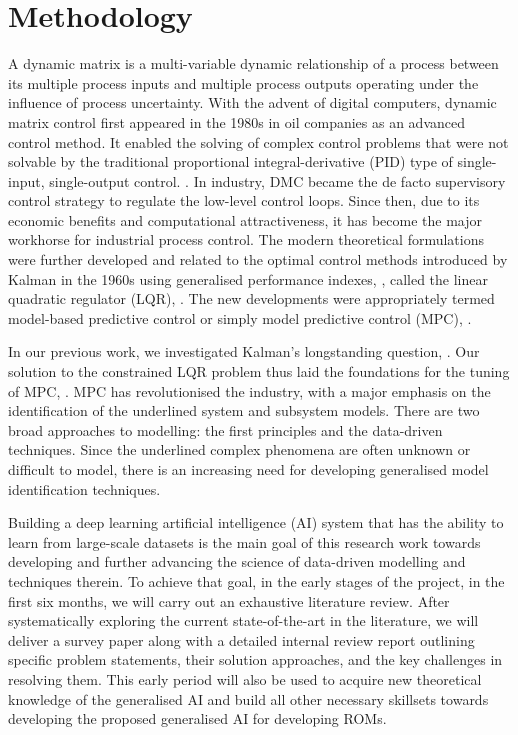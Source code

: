 \documentclass[oneside,11pt,a4paper]{article}
\begin{document}
\section{Methodology}
A dynamic matrix is a multi-variable dynamic relationship of a process between its multiple process inputs and multiple process outputs operating under the influence of process uncertainty. With the advent of digital computers, dynamic matrix control first appeared in the 1980s in oil companies as an advanced control method. It enabled the solving of complex control problems that were not solvable by the traditional proportional integral-derivative (PID) type of single-input, single-output control. \cite{cutler1980dynamic, qin2003survey}. In industry, DMC became the de facto supervisory control strategy to regulate the low-level control loops. Since then, due to its economic benefits and computational attractiveness, it has become the major workhorse for industrial process control. The modern theoretical formulations were further developed and related to the optimal control methods introduced by Kalman in the 1960s using generalised performance indexes, \cite{kalman1958optimal, kalman1960contributions}, called the linear quadratic regulator (LQR), \cite{bryson1996optimal}. The new developments were appropriately termed model-based predictive control or simply model predictive control (MPC), \cite{kouvaritakis2016model, rawlings2017model}.

In our previous work, we investigated Kalman's longstanding question, \cite{kalman1964}. Our solution to the constrained LQR problem thus laid the foundations for the tuning of MPC, \cite{ChmielewskiM-2004}. MPC has revolutionised the industry, with a major emphasis on the identification of the underlined system and subsystem models. There are two broad approaches to modelling: the first principles and the data-driven techniques. Since the underlined complex phenomena are often unknown or difficult to model, there is an increasing need for developing generalised model identification techniques.


Building a deep learning artificial intelligence (AI) system that has the ability to learn from large-scale datasets is the main goal of this research work towards developing and further advancing the science of data-driven modelling and techniques therein. To achieve that goal, in the early stages of the project, in the first six months, we will carry out an exhaustive literature review. After systematically exploring the current state-of-the-art in the literature, we will deliver a survey paper along with a detailed internal review report outlining specific problem statements, their solution approaches, and the key challenges in resolving them. This early period will also be used to acquire new theoretical knowledge of the generalised AI and build all other necessary skillsets towards developing the proposed generalised AI for developing ROMs.
\end{document}
